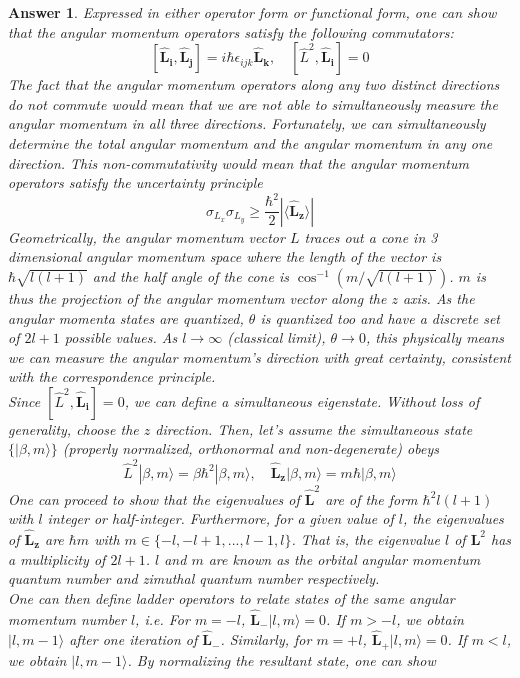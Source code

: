 \documentclass[a4paper]{article}
\newtheorem{ans}{Answer}[subsection]
\theoremstyle{new}
\begin{document}
\begin{ans}
Expressed in either operator form or functional form, one can show that the angular momentum operators satisfy the following commutators:
$$[\mathbf{\hat{L}_i},\mathbf{\hat{L}_j}]=i\hbar\epsilon_{ijk}\mathbf{\hat{L}_k},\quad [\hat{L}^2,\mathbf{\hat{L}_i}]=0$$
The fact that the angular momentum operators along any two distinct directions do not commute would mean that we are not able to simultaneously measure the angular momentum in all three directions. Fortunately, we can simultaneously determine the total angular momentum and the angular momentum in any one direction. This non-commutativity would mean that the angular momentum operators satisfy the uncertainty principle
$$\sigma_{L_x}\sigma_{L_y}\geq\frac{\hbar^2}{2}|\langle\mathbf{\hat{L}_z}\rangle|$$
Geometrically, the angular momentum vector $L$ traces out a cone in 3 dimensional angular momentum space where the length of the vector is $\hbar\sqrt{l(l+1)}$ and the half angle of the cone is $\cos^{-1}(m/\sqrt{l(l+1)})$.  $m$ is thus the projection of the angular momentum vector along the $z$ axis. As the angular momenta states are quantized, $\theta$ is quantized too and have a discrete set of $2l + 1$ possible values. As $l\rightarrow\infty$ (classical limit), $\theta\rightarrow 0$, this physically means we can measure the angular momentum's direction with great certainty, consistent with the correspondence principle.\\[5pt]
Since $[\hat{L}^2,\mathbf{\hat{L}_i}]=0$, we can define a simultaneous eigenstate. Without loss of generality, choose the $z$ direction. Then, let's assume the simultaneous state $\{|\beta,m\rangle\}$ (properly normalized, orthonormal and non-degenerate) obeys
$$\hat{L}^2|\beta,m\rangle=\beta\hbar^2|\beta,m\rangle,\quad \mathbf{\hat{L}_z}|\beta,m\rangle=m\hbar|\beta,m\rangle$$
One can proceed to show that the eigenvalues of $\mathbf{\hat{L}}^2$ are of the form $\hbar^2l(l+1)$ with $l$ integer or half-integer. Furthermore, for a given value of $l$, the eigenvalues of $\mathbf{\hat{L}_z}$ are $\hbar m$ with $m\in\{-l,-l+1,...,l-1,l\}$. That is, the eigenvalue $l$ of $\mathbf{L}^2$ has a multiplicity of $2l+1$. $l$ and $m$ are known as the orbital angular momentum quantum number and zimuthal quantum number respectively.\\[5pt]
One can then define ladder operators to relate states of the same angular momentum number $l$, i.e. For $m=-l$, $\mathbf{\hat{L}_-}|l,m\rangle=0$. If $m>-l$, we obtain $|l,m-1\rangle$ after one iteration of $\mathbf{\hat{L}_-}$. Similarly, for $m=+l$, $\mathbf{\hat{L}_+}|l,m\rangle=0$. If $m<l$, we obtain $|l,m-1\rangle$. By normalizing the resultant state, one can show 

\end{ans}
\end{document}
